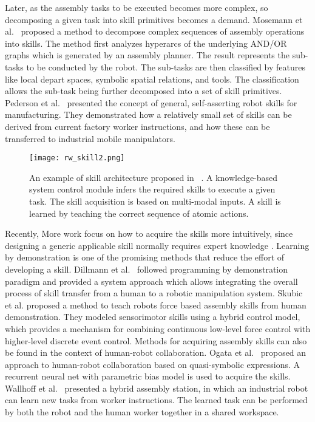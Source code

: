 Later, as the assembly tasks to be executed becomes more complex, so decomposing a given task into skill primitives becomes a demand.  Mosemann et al.~\cite{Mosemann2001} proposed a method to decompose complex sequences of assembly operations into skills. The method first analyzes hyperarcs of the underlying AND/OR graphs which is generated by an assembly planner. The result represents the sub-tasks to be conducted by the robot. The sub-tasks are then classified by features like local depart spaces, symbolic spatial relations, and tools. The classification allows the sub-task being further decomposed into a set of skill primitives. Pederson et al.~\cite{pedersen2016robot} presented the concept of general, self-asserting robot skills for manufacturing. They demonstrated how a relatively small set of skills can be derived from current factory worker instructions, and how these can be transferred to industrial mobile manipulators. 

\begin{figure}[!htbp]
\centering
\texttt{[image: rw\_skill2.png]}
\captionsetup{justification=raggedright}
\caption{An example of skill architecture proposed in ~\cite{Wallhoff2010}. A knowledge-based system control module infers the required skills to execute a given task. The skill acquisition is based on multi-modal inputs. A skill is learned by teaching the correct sequence of atomic actions. }
\label{fig:rw_skillarchitecture2}       %
\end{figure} 
Recently, More work focus on how to acquire the skills more intuitively, since designing a generic applicable skill normally requires expert knowledge \cite{Hovland1996}. Learning by demonstration is one of the promising methods that reduce the effort of developing a skill. Dillmann et al.~\cite{Dillmann2000} followed programming by demonstration paradigm and provided a system approach which allows integrating the overall process of skill transfer from a human to a robotic manipulation system.   Skubic et al. proposed a method to teach robots force based assembly skills from human demonstration. They modeled sensorimotor skills using a hybrid control model, which provides a mechanism for combining continuous low-level force control with higher-level discrete event control. Methods for acquiring assembly skills can also be found in the context of human-robot collaboration. Ogata et al.~\cite{Ogata2005} proposed an approach to human-robot collaboration based on quasi-symbolic expressions. A recurrent neural net with parametric bias  model is used to acquire the skills. Wallhoff et al.~\cite{Wallhoff2010} presented a hybrid assembly station, in which an industrial robot can learn new tasks from worker instructions. The learned task can be performed by both the robot and the human worker together in a shared workspace. 

